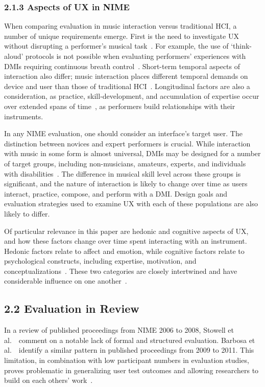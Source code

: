 \documentclass[sigconf]{nimeart}
\begin{document}
\subsubsection{2.1.3 Aspects of UX in NIME}\label{aspects-of-ux-in-nime}

When comparing evaluation in music interaction versus traditional HCI, a number of unique requirements emerge. First is the need to investigate UX without disrupting a performer's musical task~\cite{c4,c13}. For example, the use of `think-aloud' protocols is not possible when evaluating performers' experiences with DMIs requiring continuous breath control~\cite{c4}. Short-term temporal aspects of interaction also differ; music interaction places different temporal demands on device and user than those of traditional HCI~\cite{c9}. Longitudinal factors are also a consideration, as practice, skill-development, and accumulation of expertise occur over extended spans of time~\cite{c2}, as performers build relationships with their instruments.~

In any NIME evaluation, one should consider an interface's target user. The distinction between novices and expert performers is crucial. While interaction with music in some form is almost universal, DMIs may be designed for a number of target groups, including non-musicians, amateurs, experts, and individuals with disabilities~\cite{c17}. The difference in musical skill level across these groups is significant, and the nature of interaction is likely to change over time as users interact, practice, compose, and perform with a DMI. Design goals and evaluation strategies used to examine UX with each of these populations are also likely to differ.

Of particular relevance in this paper are hedonic and cognitive aspects of UX, and how these factors change over time spent interacting with an instrument. Hedonic factors relate to affect and emotion, while cognitive factors relate to psychological constructs, including expertise, motivation, and conceptualizations~\cite{c18}. These two categories are closely intertwined and have considerable influence on one another~\cite{c19,c20}.

\subsection{2.2 Evaluation in Review}\label{evaluation-in-review}

In a review of published proceedings from NIME 2006 to 2008, Stowell et al.~\cite{c4}~comment on a notable lack of formal and structured evaluation. Barbosa et al.~\cite{c1}~identify a similar pattern in published proceedings from 2009 to 2011. This limitation, in combination with low participant numbers in evaluation studies, proves problematic in generalizing user test outcomes and allowing researchers to build on each others' work~\cite{c4}.~
\end{document}
